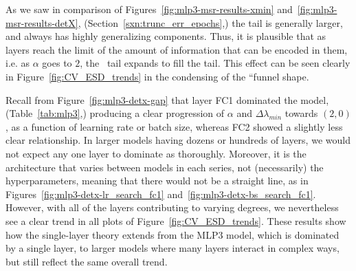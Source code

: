 As we saw in comparison of Figures~\ref{fig:mlp3-msr-results-xmin} and~\ref{fig:mlp3-msr-results-detX}, 
(Section~\ref{sxn:trunc_err_epochs},) the \TRACELOG tail is generally larger, and always has highly generalizing 
components. Thus, it is plausible that as layers reach the limit of the amount of information that can be encoded in 
them, i.e. as $\alpha$ goes to $2$, the \POWERLAW~tail expands to fill the \TRACELOG tail. This effect can be seen 
clearly in Figure~\ref{fig:CV_ESD_trends} in the condensing of the ``funnel shape.

Recall from Figure~\ref{fig:mlp3-detx-gap} that layer FC1 dominated the model, (Table~\ref{tab:mlp3},) producing a clear 
progression of $\alpha$ and $\Delta\lambda_{min}$ towards $(2, 0)$, as a function of learning rate or batch size, whereas FC2 showed a slightly less clear relationship. 
In larger models having dozens or hundreds of layers, we would not expect any one layer to dominate as thoroughly.
Moreover, it is the architecture that varies between models in each series, not (necessarily) the hyperparameters, meaning that there would not be a straight line, as in Figures~\ref{fig:mlp3-detx-lr_search_fc1} and~\ref{fig:mlp3-detx-bs_search_fc1}. 
However, with all of the layers contributing to varying degrees, we nevertheless see a clear trend in all plots of Figure~\ref{fig:CV_ESD_trends}. 
These results show how the single-layer \SETOL theory extends from the MLP3 model, which is dominated by a single layer, to larger models where many layers interact in complex ways, but still reflect the same overall trend.


